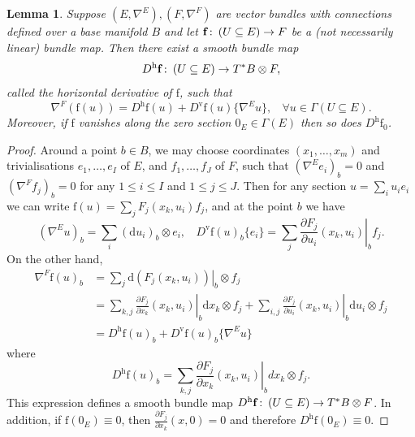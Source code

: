\documentclass{article}
\numberwithin{equation}{section}        %
\theoremstyle{bfnote}
\newtheorem{lem}[thm]{Lemma}                %
\theoremstyle{definition}
\theoremstyle{bfremark}
\newcommand{\col}{\colon \thinspace}        %
\newcommand{\diff}{\mathrm{d}}                      %
\newcommand{\bmap}[1]{\boldsymbol{\mathrm{#1}}}     %
\begin{document}
\begin{lem}     \label{lem: First derivative of bundle map}
    Suppose $(E,\nabla^E), (F,\nabla^F)$ are vector bundles with connections defined over a base manifold $B$ and let $\bmap{f} \col (U \subseteq E) \rightarrow F$ be a (not necessarily linear) bundle map. Then there exist a smooth bundle map
    \begin{equation*}
        D^{\mathrm{h}} \bmap{f} \col (U \subseteq E) \to T^*B \otimes F ,
    \end{equation*}
    called the horizontal derivative of $\bmap{f}$, such that
    \begin{equation*}
        \nabla^{F}(\bmap{f}(u)) = D^{\mathrm{h}} \bmap{f}(u) + D^{\mathrm{v}} \bmap{f}(u)\{\nabla^{E} u\}, ~~~~ \forall u \in \Gamma(U \subseteq E) .
    \end{equation*}
    Moreover, if $\bmap{f}$ vanishes along the zero section $0_E \in \Gamma(E)$ then so does $D^{\mathrm{h}} \bmap{f}_0$.
\end{lem}

\begin{proof}
    Around a point $b \in B$, we may choose coordinates $(x_1,\ldots,x_m)$ and trivialisations $e_1,\ldots,e_I$ of $E$, and $f_1,\ldots,f_J$ of $F$, such that $(\nabla^{E} e_i)_b = 0$ and $(\nabla^{F} f_j)_b = 0$ for any $1 \leq i \leq I$ and $1 \leq j \leq J$. Then for any section $u = \sum_i u_i e_i$ we can write $\bmap{f}(u) = \sum_j F_j(x_k, u_i)f_j$, and at the point $b$ we have
    \begin{equation*}
        (\nabla^E u)_b = \sum_{i} (\diff u_i)_b \otimes e_i, ~~~~ D^{\mathrm{v}} \bmap{f}(u)_b\{e_i\} = \sum_{j} \left. \frac{\partial F_j}{\partial u_i} (x_k,u_i)\right|_b f_j.
    \end{equation*}
    On the other hand,
    \begin{align*}
        \nabla^{F} \bmap{f}(u)_b & = \sum_j \left. \diff (F_j(x_k,u_i)) \right|_b \otimes f_j \\
        & = \sum_{k,j} \left. \frac{\partial F_j}{\partial x_k}(x_k,u_i) \right|_b \diff x_k \otimes f_j +\sum_{i,j} \left.  \frac{\partial F_j}{\partial u_i}(x_k,u_i)\right|_b \diff u_i \otimes f_j  \\
        & = D^{\mathrm{h}} \bmap{f}(u)_b + D^{\mathrm{v}} \bmap{f}(u)_b \{\nabla^{E} u\}
    \end{align*}
    where 
    \begin{equation*}
        D^{\mathrm{h}} \bmap{f}(u)_b = \sum_{k,j} \left. \frac{\partial F_j}{\partial x_k}(x_k,u_i) \right|_b dx_k \otimes f_j .
    \end{equation*}
    This expression defines a smooth bundle map $D^{\mathrm{h}} \bmap{f} \col (U \subseteq E) \to T^*B \otimes F$. In addition, if $\bmap{f}(0_E) \equiv 0$, then $\frac{\partial F_j}{\partial x_k}(x,0) = 0$ and therefore $D^{\mathrm{h}} \bmap{f}(0_E) \equiv 0$.
\end{proof}
\end{document}
